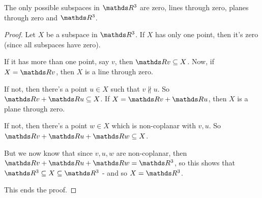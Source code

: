 \begin{theorem}
	The only possible subspaces in $\R^3$ are zero, lines through zero, planes through zero and $\R^3$.
\end{theorem}
\begin{proof}
	Let $X$ be a subspace in $\R^3$. If $X$ has only one point, then it's zero (since all subspaces have zero).
	
	If it has more than one point, say $v$, then $\R v\subseteq X$. Now, if $X=\R v$, then $X$ is a line through zero.
	
	If not, then there's a point $u\in X$ such that $v\nparallel u$. So $\R v+\R u\subseteq X$. If $X=\R v+\R u$, then $X$ is a plane through zero.
	
	If not, then there's a point $w\in X$ which is non-coplanar with $v,u$. So $ \R v+\R u+\R w\subseteq X$.
	
	But we now know that since $v,u,w$ are non-coplanar, then $\R v+\R u+\R w=\R^3$, so this shows that $\R^3\subseteq X\subseteq \R^3$ - and so $X=\R^3$.
	
	This ends the proof.
\end{proof}

